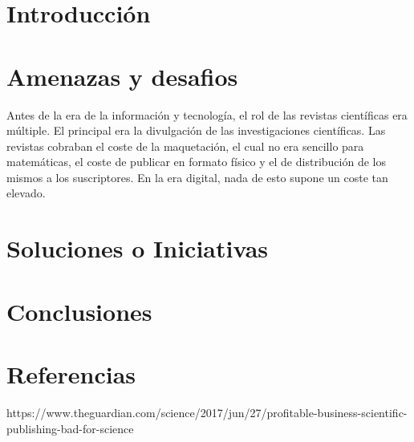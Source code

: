 \section{Introducción}
\section{Amenazas y desafios}

Antes de la era de la información y tecnología, el rol de las revistas científicas era múltiple. El principal era la divulgación de las investigaciones científicas. Las revistas cobraban el coste de la maquetación, el cual no era sencillo para matemáticas, el coste de publicar en formato físico y el de distribución de los mismos a los suscriptores. En la era digital, nada de esto supone un coste tan elevado.



\section{Soluciones o Iniciativas}
\section{Conclusiones}
\section{Referencias}

https://www.theguardian.com/science/2017/jun/27/profitable-business-scientific-publishing-bad-for-science
